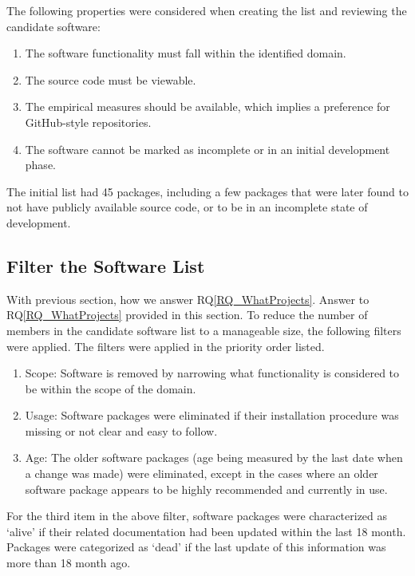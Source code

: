 \documentclass[final, 3p, times, authoryear]{elsarticle}
\newcommand{\rqref}[1]{RQ\ref{#1}}
\begin{document}
The following properties were considered when creating the list and reviewing
the candidate software:

\begin{enumerate}
	\item The software functionality must fall within the identified domain.
	\item The source code must be viewable.
	\item The empirical measures should be available, which implies a preference
	for GitHub-style repositories.
	\item The software cannot be marked as incomplete or in an initial
	development phase.
\end{enumerate}

The initial list had 45 packages, including a few packages that were later found
to not have publicly available source code, or to be in an incomplete state of
development. 

\subsection{Filter the Software List} \label{filtersoftware}

With previous section, how we answer \rqref{RQ_WhatProjects}.  Answer to
\rqref{RQ_WhatProjects} provided in this section.  To reduce the number of
members in the candidate software list to a manageable size, the following
filters were applied. The filters were applied in the priority order listed.

\begin{enumerate}
	\item Scope: Software is removed by narrowing what functionality is
	considered to be within the scope of the domain.
	\item Usage: Software packages were eliminated if their installation
	procedure was missing or not clear and easy to follow.
	\item Age: The older software packages (age being measured by the last date
	when a change was made) were eliminated, except in the cases where an older
	software package appears to be highly recommended and currently in use. 
\end{enumerate}

For the third item in the above filter, software packages were characterized as
`alive' if their related documentation had been updated within the last 18
month. Packages were categorized as `dead' if the last update of this
information was more than 18 month ago.
\end{document}
